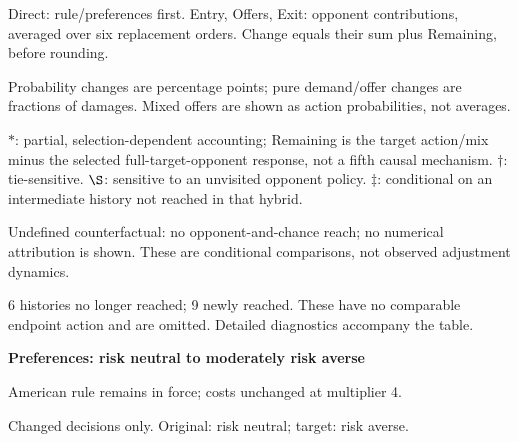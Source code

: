 \documentclass[10pt]{article}
\begin{document}
{\footnotesize Direct: rule/preferences first. Entry, Offers, Exit: opponent contributions, averaged over six replacement orders. Change equals their sum plus Remaining, before rounding.\par
Probability changes are percentage points; pure demand/offer changes are fractions of damages. Mixed offers are shown as action probabilities, not averages.\par
$*$: partial, selection-dependent accounting; Remaining is the target action/mix minus the selected full-target-opponent response, not a fifth causal mechanism. $\dagger$: tie-sensitive. $\S$: sensitive to an unvisited opponent policy. $\ddagger$: conditional on an intermediate history not reached in that hybrid.\par
Undefined counterfactual: no opponent-and-chance reach; no numerical attribution is shown. These are conditional comparisons, not observed adjustment dynamics.\par
6 histories no longer reached; 9 newly reached. These have no comparable endpoint action and are omitted. Detailed diagnostics accompany the table.}\par
\clearpage
{\large\bfseries Preferences: risk neutral to moderately risk averse}\par
American rule remains in force; costs unchanged at multiplier 4.\par
{\small Changed decisions only. Original: risk neutral; target: risk averse.}\par
\end{document}
